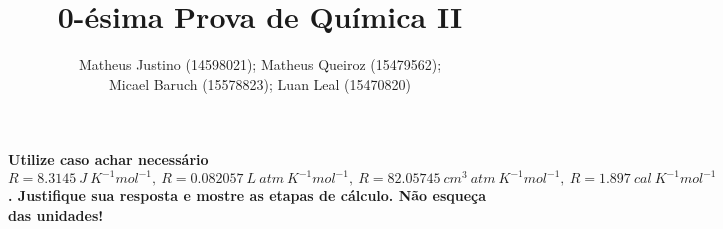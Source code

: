 \documentclass{article}
\author{Matheus Justino (14598021); Matheus Queiroz (15479562);\\ Micael Baruch
(15578823); Luan Leal (15470820)}
\title{0-ésima Prova de Química II}
\begin{document}
\maketitle

    \textbf{Utilize caso achar necessário \(R = \qty{8,3145}{J\ K^{-1} mol^{-1}}, \
    R = \qty{0,082057}{L\ atm\ K^{-1} mol^{-1}}, \ 
    R = \qty{82,05745}{cm^3\ atm\ K^{-1} mol^{-1}}, \
    R = \qty{1,897}{cal\ K^{-1} mol^{-1}}\).
    Justifique sua resposta e mostre as etapas de cálculo. Não esqueça das
    unidades!}
    
    
    
    
    
    
\end{document}
